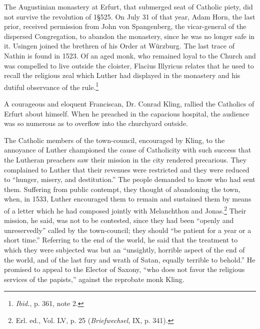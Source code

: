 The Augustinian monastery at Erfurt, that submerged seat of
Catholic piety, did not survive the revolution of 1§525. On July
31 of that year, Adam Horn, the last prior, received permission
from John von Spangenberg, the vicar-general of the dispersed
Congregation, to abandon the monastery, since he was no longer
safe in it. Usingen joined the brethren of his Order at Würzburg.
The last trace of Nathin is found in 1523. Of an aged monk, who
remained loyal to the Church and was compelled to live outside
the cloister, Flacius Illyricus relates that he used to recall the religious
zeal which Luther had displayed in the monastery and his dutiful observance
of the rule.\footnote{\textit{Ibid.}, p. 361, note 2.}

A courageous and eloquent Franciscan, Dr. Conrad Kling, rallied
the Catholics of Erfurt about himself. When he preached in the
capacious hospital, the audience was so numerous as to overflow
into the churchyard outside.

The Catholic members of the town-council, encouraged by Kling,
to the annoyance of Luther championed the cause of Catholicity
with such success that the Lutheran preachers saw their mission in
the city rendered precarious. They complained to Luther that their
revenues were restricted and they were reduced to “hunger, misery,
and destitution.” The people demanded to know who had sent
them. Suffering from public contempt, they thought of abandoning the town,
when, in 1533, Luther encouraged them to remain and
sustained them by means of a letter which he had composed jointly
with Melanchthon and Jonas.\footnote{Erl. ed., Vol. LV, p. 25 (\textit{Briefwechsel}, IX, p. 341).}
Their mission, he said, was not to
be contested, since they had been “openly and unreservedly” called
by the town-council; they should “be patient for a year or a short
time.” Referring to the end of the world, he said that the treatment
to which they were subjected was but an “unsightly, horrible
aspect of the end of the world, and of the last fury and wrath of
Satan, equally terrible to behold.” He promised to appeal to the
Elector of Saxony, “who does not favor the religious services of the
papists,” against the reprobate monk Kling.

